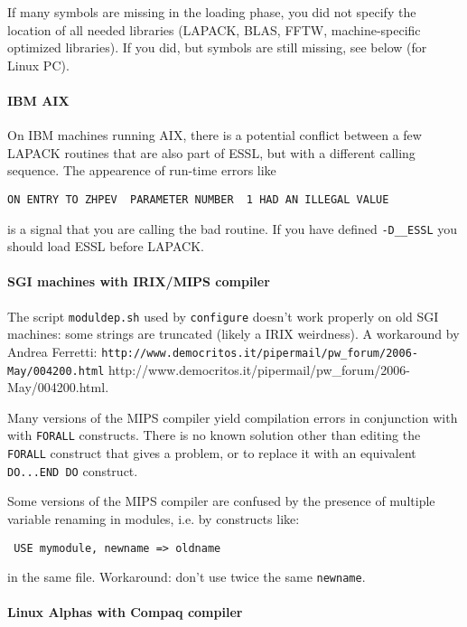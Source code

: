 \documentclass[12pt,a4paper]{article}
\begin{document}
If many symbols are missing in the loading phase, you did not specify
the location of all needed libraries (LAPACK, BLAS, FFTW,
machine-specific optimized libraries).  If you did, but symbols are
still missing, see below (for Linux PC).

\paragraph{IBM AIX}

On IBM machines running AIX, there is a potential conflict between 
a few LAPACK routines that are also part of ESSL, but with a different
calling sequence. The appearence of run-time errors like
\begin{verbatim}
ON ENTRY TO ZHPEV  PARAMETER NUMBER  1 HAD AN ILLEGAL VALUE
\end{verbatim}
is a signal that you are calling the bad routine. If you have 
defined \texttt{-D\_\_ESSL} you should load ESSL before LAPACK.

\paragraph{SGI machines with IRIX/MIPS compiler}

The script \texttt{moduldep.sh} used by \texttt{configure} doesn't
work properly on old SGI machines: some strings are truncated
(likely a IRIX weirdness). A workaround by Andrea Ferretti: 
\htmladdnormallink%
{\texttt{http://www.democritos.it/pipermail/pw\_forum/2006-May/004200.html}}
{http://www.democritos.it/pipermail/pw\_forum/2006-May/004200.html}.

Many versions of the MIPS compiler yield compilation errors in
conjunction with with \texttt{FORALL} constructs. There is no
known solution other than editing the \texttt{FORALL} construct
that gives a problem, or to replace it with an equivalent 
\texttt{DO...END DO} construct.

Some versions of the MIPS compiler are confused by the presence of
multiple variable renaming in modules, i.e. by constructs like:
\begin{verbatim}
 USE mymodule, newname => oldname
\end{verbatim}
in the same file. Workaround: don't use twice the same \texttt{newname}.

\paragraph{Linux Alphas with Compaq compiler}
\end{document}
